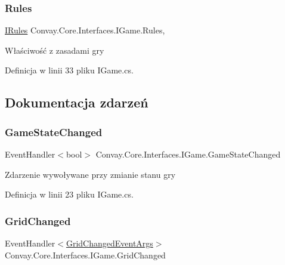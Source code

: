 \subsubsection{\texorpdfstring{Rules}{Rules}}
{\footnotesize\ttfamily \hyperlink{interface_convay_1_1_core_1_1_interfaces_1_1_i_rules}{I\+Rules} Convay.\+Core.\+Interfaces.\+I\+Game.\+Rules\hspace{0.3cm}{\ttfamily [get]}, {\ttfamily [set]}}



Właściwość z zasadami gry 



Definicja w linii 33 pliku I\+Game.\+cs.



\subsection{Dokumentacja zdarzeń}
\hypertarget{interface_convay_1_1_core_1_1_interfaces_1_1_i_game_a7c8532b2d8ae9edd0e39a21cab0a8b9f}{}\label{interface_convay_1_1_core_1_1_interfaces_1_1_i_game_a7c8532b2d8ae9edd0e39a21cab0a8b9f} 
\subsubsection{\texorpdfstring{Game\+State\+Changed}{GameStateChanged}}
{\footnotesize\ttfamily Event\+Handler$<$bool$>$ Convay.\+Core.\+Interfaces.\+I\+Game.\+Game\+State\+Changed}



Zdarzenie wywoływane przy zmianie stanu gry 



Definicja w linii 23 pliku I\+Game.\+cs.

\hypertarget{interface_convay_1_1_core_1_1_interfaces_1_1_i_game_abfec674f941f9534cffa15f6bd5c96b1}{}\label{interface_convay_1_1_core_1_1_interfaces_1_1_i_game_abfec674f941f9534cffa15f6bd5c96b1} 
\subsubsection{\texorpdfstring{Grid\+Changed}{GridChanged}}
{\footnotesize\ttfamily Event\+Handler$<$\hyperlink{class_convay_1_1_core_1_1_grid_changed_event_args}{Grid\+Changed\+Event\+Args}$>$ Convay.\+Core.\+Interfaces.\+I\+Game.\+Grid\+Changed}



